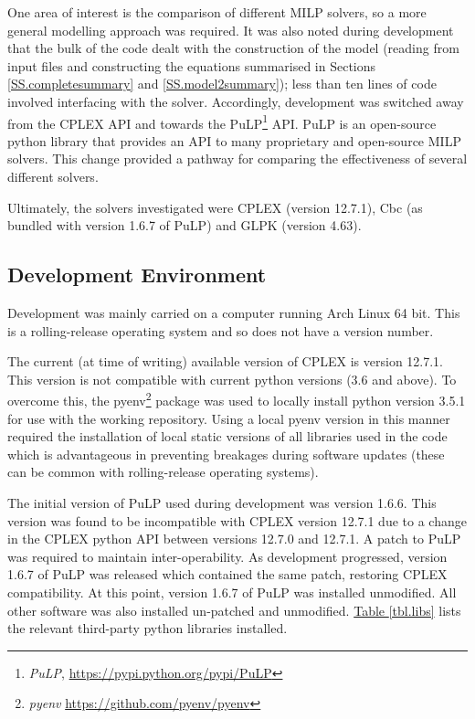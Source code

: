 One area of interest is the comparison of different MILP solvers, so a more
general modelling approach was required.
It was also noted during development that the bulk of the code dealt with the
construction of the model (reading from input files and constructing the
equations summarised in Sections \ref{SS.completesummary} and 
\ref{SS.model2summary}); less than ten lines of code involved interfacing with
the solver.
Accordingly, development was switched away from the CPLEX API and towards the
PuLP\footnote{\emph{PuLP}, \url{https://pypi.python.org/pypi/PuLP}} API.
PuLP is an open-source python library that provides an API to many proprietary
and open-source MILP solvers.
This change provided a pathway for comparing the effectiveness of several
different solvers.

Ultimately, the solvers investigated were CPLEX (version 12.7.1), Cbc
(as bundled with version 1.6.7 of PuLP) and GLPK (version 4.63).

\subsection{Development Environment}\label{SS.envir}

Development was mainly carried on a computer running Arch Linux 64 bit.
This is a rolling-release operating system and so does not have a version
number.

The current (at time of writing) available version of CPLEX is version 12.7.1.
This version is not compatible with current python versions (3.6 and above).
To overcome this, the
pyenv\footnote{\emph{pyenv} \url{https://github.com/pyenv/pyenv}}
package was used to locally install python version
3.5.1 for use with the working repository.
Using a local pyenv version in this manner required the installation of local
static versions of all libraries used in the code which is advantageous in
preventing breakages during software updates (these can be common with
rolling-release operating systems).

The initial version of PuLP used during development was version 1.6.6.
This version was found to be incompatible with CPLEX version 12.7.1 due to a
change in the CPLEX python API between versions 12.7.0 and 12.7.1.
A patch to PuLP was required to maintain inter-operability.
As development progressed, version 1.6.7 of PuLP was released which contained
the same patch, restoring CPLEX compatibility.
At this point, version 1.6.7 of PuLP was installed unmodified.  All other
software was also installed un-patched and unmodified.
\hyperref[tbl.libs]{Table \ref*{tbl.libs}} lists the relevant third-party
python libraries installed.

